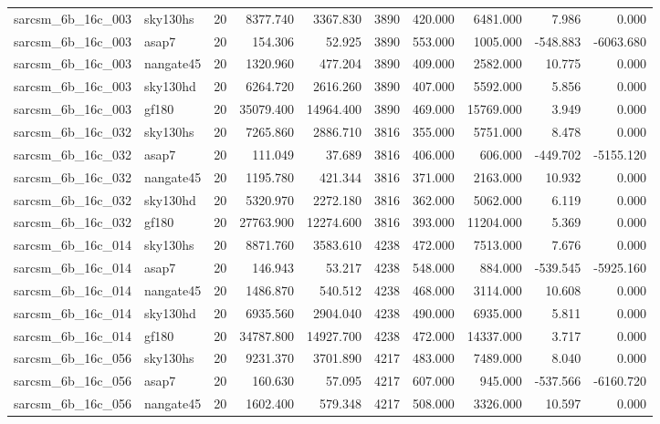 \begin{longtable}{llrrrrrrrr}
sarcsm\_6b\_16c\_003 & sky130hs & 20 & 8377.740 & 3367.830 & 3890 & 420.000 & 6481.000 & 7.986 & 0.000 \\
sarcsm\_6b\_16c\_003 & asap7 & 20 & 154.306 & 52.925 & 3890 & 553.000 & 1005.000 & -548.883 & -6063.680 \\
sarcsm\_6b\_16c\_003 & nangate45 & 20 & 1320.960 & 477.204 & 3890 & 409.000 & 2582.000 & 10.775 & 0.000 \\
sarcsm\_6b\_16c\_003 & sky130hd & 20 & 6264.720 & 2616.260 & 3890 & 407.000 & 5592.000 & 5.856 & 0.000 \\
sarcsm\_6b\_16c\_003 & gf180 & 20 & 35079.400 & 14964.400 & 3890 & 469.000 & 15769.000 & 3.949 & 0.000 \\
sarcsm\_6b\_16c\_032 & sky130hs & 20 & 7265.860 & 2886.710 & 3816 & 355.000 & 5751.000 & 8.478 & 0.000 \\
sarcsm\_6b\_16c\_032 & asap7 & 20 & 111.049 & 37.689 & 3816 & 406.000 & 606.000 & -449.702 & -5155.120 \\
sarcsm\_6b\_16c\_032 & nangate45 & 20 & 1195.780 & 421.344 & 3816 & 371.000 & 2163.000 & 10.932 & 0.000 \\
sarcsm\_6b\_16c\_032 & sky130hd & 20 & 5320.970 & 2272.180 & 3816 & 362.000 & 5062.000 & 6.119 & 0.000 \\
sarcsm\_6b\_16c\_032 & gf180 & 20 & 27763.900 & 12274.600 & 3816 & 393.000 & 11204.000 & 5.369 & 0.000 \\
sarcsm\_6b\_16c\_014 & sky130hs & 20 & 8871.760 & 3583.610 & 4238 & 472.000 & 7513.000 & 7.676 & 0.000 \\
sarcsm\_6b\_16c\_014 & asap7 & 20 & 146.943 & 53.217 & 4238 & 548.000 & 884.000 & -539.545 & -5925.160 \\
sarcsm\_6b\_16c\_014 & nangate45 & 20 & 1486.870 & 540.512 & 4238 & 468.000 & 3114.000 & 10.608 & 0.000 \\
sarcsm\_6b\_16c\_014 & sky130hd & 20 & 6935.560 & 2904.040 & 4238 & 490.000 & 6935.000 & 5.811 & 0.000 \\
sarcsm\_6b\_16c\_014 & gf180 & 20 & 34787.800 & 14927.700 & 4238 & 472.000 & 14337.000 & 3.717 & 0.000 \\
sarcsm\_6b\_16c\_056 & sky130hs & 20 & 9231.370 & 3701.890 & 4217 & 483.000 & 7489.000 & 8.040 & 0.000 \\
sarcsm\_6b\_16c\_056 & asap7 & 20 & 160.630 & 57.095 & 4217 & 607.000 & 945.000 & -537.566 & -6160.720 \\
sarcsm\_6b\_16c\_056 & nangate45 & 20 & 1602.400 & 579.348 & 4217 & 508.000 & 3326.000 & 10.597 & 0.000 \\

\end{longtable}
